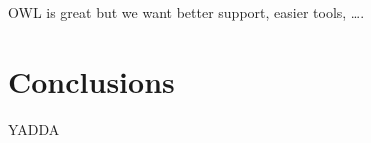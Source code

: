 \documentclass{llncs}
\begin{document}
OWL is great but we want better support, easier tools, ….













\section{Conclusions}

YADDA



\end{document}
